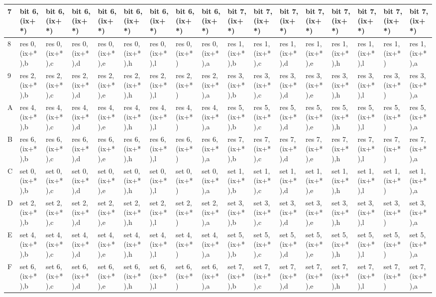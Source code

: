 \begin{ttfamily}
\begin{tiny}
\begin{tabularx}{1\textwidth}{l|X|X|X|X|X|X|X|X|X|X|X|X|X|X|X|X}
7 & bit 6, (ix+*) & bit 6, (ix+*) & bit 6, (ix+*) & bit 6, (ix+*) & bit 6, (ix+*) & bit 6, (ix+*) & bit 6, (ix+*) & bit 6, (ix+*) & bit 7, (ix+*) & bit 7, (ix+*) & bit 7, (ix+*) & bit 7, (ix+*) & bit 7, (ix+*) & bit 7, (ix+*) & bit 7, (ix+*) & bit 7, (ix+*) \\ \hline
8 & res 0, (ix+*),b & res 0, (ix+*),c & res 0, (ix+*),d & res 0, (ix+*),e & res 0, (ix+*),h & res 0, (ix+*),l & res 0, (ix+*) & res 0, (ix+*),a & res 1, (ix+*),b & res 1, (ix+*),c & res 1, (ix+*),d & res 1, (ix+*),e & res 1, (ix+*),h & res 1, (ix+*),l & res 1, (ix+*) & res 1, (ix+*),a \\ \hline
9 & res 2, (ix+*),b & res 2, (ix+*),c & res 2, (ix+*),d & res 2, (ix+*),e & res 2, (ix+*),h & res 2, (ix+*),l & res 2, (ix+*) & res 2, (ix+*),a & res 3, (ix+*),b & res 3, (ix+*),c & res 3, (ix+*),d & res 3, (ix+*),e & res 3, (ix+*),h & res 3, (ix+*),l & res 3, (ix+*) & res 3, (ix+*),a \\ \hline
A & res 4, (ix+*),b & res 4, (ix+*),c & res 4, (ix+*),d & res 4, (ix+*),e & res 4, (ix+*),h & res 4, (ix+*),l & res 4, (ix+*) & res 4, (ix+*),a & res 5, (ix+*),b & res 5, (ix+*),c & res 5, (ix+*),d & res 5, (ix+*),e & res 5, (ix+*),h & res 5, (ix+*),l & res 5, (ix+*) & res 5, (ix+*),a \\ \hline
B & res 6, (ix+*),b & res 6, (ix+*),c & res 6, (ix+*),d & res 6, (ix+*),e & res 6, (ix+*),h & res 6, (ix+*),l & res 6, (ix+*) & res 6, (ix+*),a & res 7, (ix+*),b & res 7, (ix+*),c & res 7, (ix+*),d & res 7, (ix+*),e & res 7, (ix+*),h & res 7, (ix+*),l & res 7, (ix+*) & res 7, (ix+*),a \\ \hline
C & set 0, (ix+*),b & set 0, (ix+*),c & set 0, (ix+*),d & set 0, (ix+*),e & set 0, (ix+*),h & set 0, (ix+*),l & set 0, (ix+*) & set 0, (ix+*),a & set 1, (ix+*),b & set 1, (ix+*),c & set 1, (ix+*),d & set 1, (ix+*),e & set 1, (ix+*),h & set 1, (ix+*),l & set 1, (ix+*) & set 1, (ix+*),a \\ \hline
D & set 2, (ix+*),b & set 2, (ix+*),c & set 2, (ix+*),d & set 2, (ix+*),e & set 2, (ix+*),h & set 2, (ix+*),l & set 2, (ix+*) & set 2, (ix+*),a & set 3, (ix+*),b & set 3, (ix+*),c & set 3, (ix+*),d & set 3, (ix+*),e & set 3, (ix+*),h & set 3, (ix+*),l & set 3, (ix+*) & set 3, (ix+*),a \\ \hline
E & set 4, (ix+*),b & set 4, (ix+*),c & set 4, (ix+*),d & set 4, (ix+*),e & set 4, (ix+*),h & set 4, (ix+*),l & set 4, (ix+*) & set 4, (ix+*),a & set 5, (ix+*),b & set 5, (ix+*),c & set 5, (ix+*),d & set 5, (ix+*),e & set 5, (ix+*),h & set 5, (ix+*),l & set 5, (ix+*) & set 5, (ix+*),a \\ \hline
F & set 6, (ix+*),b & set 6, (ix+*),c & set 6, (ix+*),d & set 6, (ix+*),e & set 6, (ix+*),h & set 6, (ix+*),l & set 6, (ix+*) & set 6, (ix+*),a & set 7, (ix+*),b & set 7, (ix+*),c & set 7, (ix+*),d & set 7, (ix+*),e & set 7, (ix+*),h & set 7, (ix+*),l & set 7, (ix+*) & set 7, (ix+*),a \\ \hline
\end{tabularx}
\end{tiny}
\end{ttfamily}

